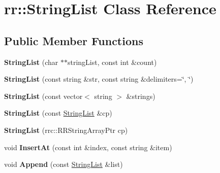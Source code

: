 \hypertarget{classrr_1_1_string_list}{\section{rr\-:\-:String\-List Class Reference}
\label{classrr_1_1_string_list}
}
\subsection*{Public Member Functions}
\begin{DoxyCompactItemize}
\item 
\hypertarget{classrr_1_1_string_list_ae917d1a90b15846ca3642122405c945a}{{\bfseries String\-List} (char $\ast$$\ast$string\-List, const int \&count)}\label{classrr_1_1_string_list_ae917d1a90b15846ca3642122405c945a}

\item 
\hypertarget{classrr_1_1_string_list_a257248974b2735eea3419567552c2e80}{{\bfseries String\-List} (const string \&str, const string \&delimiters=\char`\"{}, \char`\"{})}\label{classrr_1_1_string_list_a257248974b2735eea3419567552c2e80}

\item 
\hypertarget{classrr_1_1_string_list_a6caba551d7c334d733f61b5f1e47bb6f}{{\bfseries String\-List} (const vector$<$ string $>$ \&strings)}\label{classrr_1_1_string_list_a6caba551d7c334d733f61b5f1e47bb6f}

\item 
\hypertarget{classrr_1_1_string_list_a741a25dfad12e837f3e118bda67e237e}{{\bfseries String\-List} (const \hyperlink{classrr_1_1_string_list}{String\-List} \&cp)}\label{classrr_1_1_string_list_a741a25dfad12e837f3e118bda67e237e}

\item 
\hypertarget{classrr_1_1_string_list_a3ff5c3c0b4a742ceeb78fa54eef7f4da}{{\bfseries String\-List} (rrc\-::\-R\-R\-String\-Array\-Ptr cp)}\label{classrr_1_1_string_list_a3ff5c3c0b4a742ceeb78fa54eef7f4da}

\item 
\hypertarget{classrr_1_1_string_list_a2099abbe95f64c677e8711ffaf2d47de}{void {\bfseries Insert\-At} (const int \&index, const string \&item)}\label{classrr_1_1_string_list_a2099abbe95f64c677e8711ffaf2d47de}

\item 
\hypertarget{classrr_1_1_string_list_a3c37396d7124066cde232a9eb11bea23}{void {\bfseries Append} (const \hyperlink{classrr_1_1_string_list}{String\-List} \&list)}\label{classrr_1_1_string_list_a3c37396d7124066cde232a9eb11bea23}


\end{DoxyCompactItemize}
